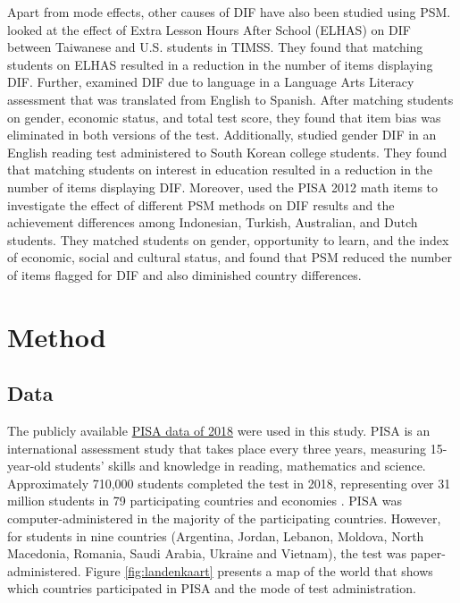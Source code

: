 \documentclass{article}
\begin{document}
Apart from mode effects, other causes of DIF have also been studied using PSM. \citet{wu2006using} looked at the effect of Extra Lesson Hours After School (ELHAS) on DIF between Taiwanese and U.S. students in TIMSS. They found that matching students on ELHAS resulted in a reduction in the number of items displaying DIF. Further, \citet{joldersma2010application} examined DIF due to language in a Language Arts Literacy assessment that was translated from English to Spanish. After matching students on gender, economic status, and total test score, they found that item bias was eliminated in both versions of the test. Additionally, \citet{lee2014effect} studied gender DIF in an English reading test administered to South Korean college students. They found that matching students on interest in education resulted in a reduction in the number of items displaying DIF. Moreover, \citet{arikan2018propensity} used the PISA 2012 math items to investigate the effect of different PSM methods on DIF results and the achievement differences among Indonesian, Turkish, Australian, and Dutch students. They matched students on gender, opportunity to learn, and the index of economic, social and cultural status, and found that PSM reduced the number of items flagged for DIF and also diminished country differences.  

\section{Method} \label{Method}

\subsection{Data} \label{sec:data}

The publicly available \href{https://www.oecd.org/pisa/data/2018database/}{PISA data of 2018} were used in this study. PISA is an international assessment study that takes place every three years, measuring 15-year-old students' skills and knowledge in reading, mathematics and science. Approximately 710,000 students completed the test in 2018, representing over 31 million students in 79 participating countries and economies \citep{PISA2018assessment}. PISA was computer-administered in the majority of the participating countries. However, for students in nine countries (Argentina, Jordan, Lebanon, Moldova, North Macedonia, Romania, Saudi Arabia, Ukraine and Vietnam), the test was paper-administered. Figure \ref{fig:landenkaart} presents a map of the world that shows which countries participated in PISA and the mode of test administration. 
\end{document}
